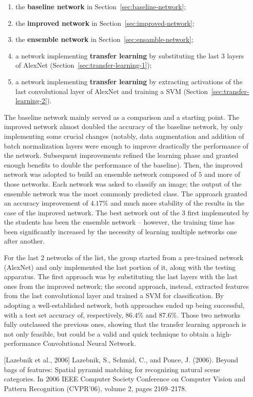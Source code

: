 \documentclass[a4paper, 11pt]{article} %
\begin{document}
\begin{enumerate}
    \item the \textbf{baseline network} in Section~\ref{sec:baseline-network};
    \item the \textbf{improved network} in Section~\ref{sec:improved-network};
    \item the \textbf{ensemble network} in Section~\ref{sec:ensamble-network};
    \item a network implementing \textbf{transfer learning} by substituting the last $3$ layers of AlexNet (Section~\ref{sec:transfer-learning-1});
    \item a network implementing \textbf{transfer learning} by extracting activations of the last convolutional layer of AlexNet and training a SVM (Section~\ref{sec:transfer-learning-2}).
\end{enumerate}

The baseline network mainly served as a comparison and a starting point. The improved network almost doubled the accuracy of the baseline network, by only implementing some crucial changes (notably, data augmentation and addition of batch normalization layers were enough to improve drastically the performance of the network. Subsequent improvements refined the learning phase and granted enough benefits to double the performance of the baseline). Then, the improved network was adopted to build an ensemble network composed of $5$ and more of those networks. Each network was asked to classify an image; the output of the ensemble network was the most commonly predicted class. The approach granted an accuracy improvement of $4.17\%$ and much more stability of the results in the case of the improved network. The best network out of the $3$ first implemented by the students has been the ensemble network \--- however, the training time has been significantly increased by the necessity of learning multiple networks one after another.

For the last $2$ networks of the list, the group started from a pre-trained network (AlexNet) and only implemented the last portion of it, along with the testing apparatus. The first approach was by substituting the last layers with the last ones from the improved network; the second approach, instead, extracted features from the last convolutional layer and trained a SVM for classification. By adopting a well-established network, both approaches ended up being successful, with a test set accuracy of, respectively, $86.4\%$ and $87.6\%$. Those two networks fully outclassed the previous ones, showing that the transfer learning approach is not only feasible, but could be a valid and quick technique to obtain a high-performance Convolutional Neural Network.

\clearpage
{}
\begin{thebibliography}{9}
         [Lazebnik et al., 2006] Lazebnik, S., Schmid, C., and Ponce, J. (2006). Beyond bags of features: Spatial pyramid matching for recognizing natural scene categories. In 2006 IEEE Computer Society Conference on Computer Vision and Pattern Recognition (CVPR’06), volume 2, pages 2169–2178.
\end{thebibliography}
\end{document}
